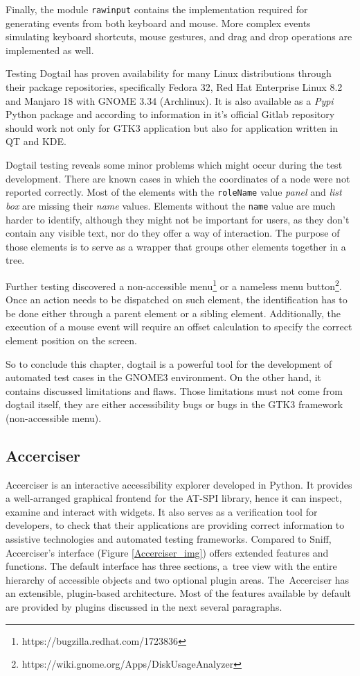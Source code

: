 Finally, the module \texttt{rawinput} contains the implementation required for generating events from both keyboard and mouse. More complex events simulating keyboard shortcuts, mouse gestures, and drag and drop operations are implemented as well.

Testing Dogtail has proven availability for many Linux distributions through their package repositories, specifically Fedora 32, Red Hat Enterprise Linux 8.2 and Manjaro 18 with GNOME 3.34 (Archlinux). It is also available as a \textit{Pypi} Python package and according to information in it's official Gitlab repository should work not only for GTK3 application but also for application written in QT and KDE. 
 
Dogtail testing reveals some minor problems which might occur during the test development. There are known cases in which the coordinates of a node were not reported correctly. Most of the elements with the \texttt{roleName} value \textit{panel} and \textit{list box} are missing their \textit{name} values. Elements without the \texttt{name} value are much harder to identify, although they might not be important for users, as they don't contain any visible text, nor do they offer a way of interaction. The purpose of those elements is to serve as a wrapper that groups other elements together in a tree. 

Further testing discovered a non-accessible menu\footnote{https://bugzilla.redhat.com/1723836} or a nameless menu button\footnote{https://wiki.gnome.org/Apps/DiskUsageAnalyzer}. Once an action needs to be dispatched on such element, the identification has to be done either through a parent element or a sibling element. Additionally, the execution of a mouse event will require an offset calculation to specify the correct element position on the screen.
 
 So to conclude this chapter, dogtail is a powerful tool for the development of automated test cases in the GNOME3 environment. On the other hand, it contains discussed limitations and flaws. Those limitations must not come from dogtail itself, they are either accessibility bugs or bugs in the GTK3 framework (non-accessible menu).  

\subsection{Accerciser}
Accerciser is an interactive accessibility explorer developed in Python. It provides a well-arranged graphical frontend for the AT-SPI library, hence it can inspect, examine and interact with widgets. It also serves as a verification tool for developers, to check that their applications are providing correct information to assistive technologies and automated testing frameworks. Compared to Sniff, Accerciser's interface (Figure \ref{Accerciser_img}) offers extended features and functions. The default interface has three sections, a~tree view with the entire hierarchy of accessible objects and two optional plugin areas. The~Accerciser has an extensible, plugin-based architecture. Most of the features available by default are provided by plugins discussed in the next several paragraphs.

